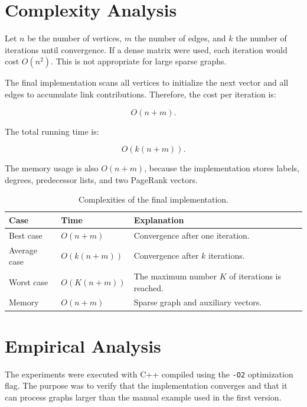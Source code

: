 \documentclass[runningheads]{llncs}
\begin{document}
\section{Complexity Analysis}

Let \(n\) be the number of vertices, \(m\) the number of edges, and \(k\) the number of iterations until convergence. If a dense matrix were used, each iteration would cost \(O(n^2)\). This is not appropriate for large sparse graphs.

The final implementation scans all vertices to initialize the next vector and all edges to accumulate link contributions. Therefore, the cost per iteration is:

\begin{equation}
O(n+m).
\end{equation}

The total running time is:

\begin{equation}
O(k(n+m)).
\end{equation}

The memory usage is also \(O(n+m)\), because the implementation stores labels, degrees, predecessor lists, and two PageRank vectors.

\begin{table}
\caption{Complexities of the final implementation.}\label{tab:complexity}
\begin{tabular}{|l|l|l|}
\hline
Case & Time & Explanation\\
\hline
Best case & \(O(n+m)\) & Convergence after one iteration.\\
Average case & \(O(k(n+m))\) & Convergence after \(k\) iterations.\\
Worst case & \(O(K(n+m))\) & The maximum number \(K\) of iterations is reached.\\
Memory & \(O(n+m)\) & Sparse graph and auxiliary vectors.\\
\hline
\end{tabular}
\end{table}

\section{Empirical Analysis}

The experiments were executed with C++ compiled using the \texttt{-O2} optimization flag. The purpose was to verify that the implementation converges and that it can process graphs larger than the manual example used in the first version.
\end{document}
